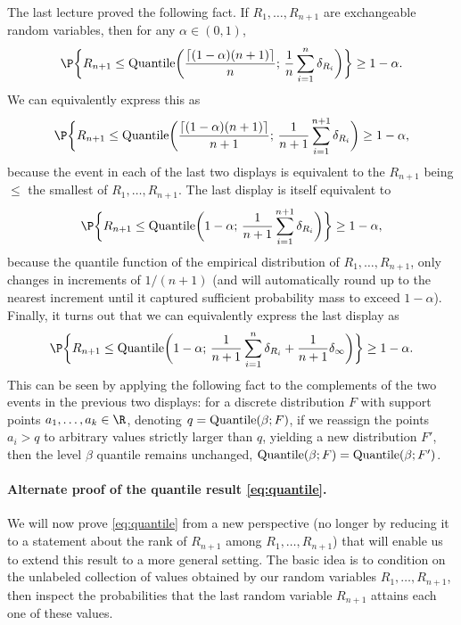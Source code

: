 \documentclass{article}
\begin{document}
The last lecture proved the following fact. If $R_1,\dots,R_{n+1}$ are
exchangeable random variables, then for any $\alpha \in (0,1)$, 
\[
\P\bigg\{ R_{n+1} \leq \Quantile\bigg( \frac{\lceil (1-\alpha)(n+1) \rceil}{n};
\, \frac{1}{n} \sum_{i=1}^n \delta_{R_i} \bigg) \bigg\} \geq 1-\alpha.
\]
We can equivalently express this as
\[
\P\bigg\{ R_{n+1} \leq \Quantile\bigg( \frac{\lceil (1-\alpha)(n+1) \rceil}{n+1}; 
\, \frac{1}{n+1} \sum_{i=1}^{n+1} \delta_{R_i} \bigg) \geq 1-\alpha,
\]
because the event in each of the last two displays is equivalent to the
$R_{n+1}$ being $\leq$ the  
smallest of $R_1,\dots,R_{n+1}$. The last display is itself equivalent to
\[
\P\bigg\{ R_{n+1} \leq \Quantile\bigg( 1-\alpha; \, \frac{1}{n+1}
\sum_{i=1}^{n+1} \delta_{R_i} \bigg) \bigg\} \geq 1-\alpha, 
\]
because the quantile function of the empirical distribution of
$R_1,\dots,R_{n+1}$, only changes in increments of $1/(n+1)$ (and will
automatically round up to the nearest increment until it captured sufficient
probability mass to exceed $1-\alpha$). Finally, it turns out that we can
equivalently express the last display as  
\begin{equation}
\label{eq:quantile}
\P\bigg\{ R_{n+1} \leq \Quantile\bigg( 1-\alpha; \, \frac{1}{n+1} \sum_{i=1}^n
\delta_{R_i} + \frac{1}{n+1} \delta_\infty \bigg) \bigg\} \geq 1-\alpha.
\end{equation}
This can be seen by applying the following fact to the complements of the two
events in the previous two displays: for a discrete distribution $F$ with
support points $a_1,\dots,a_k \in \R$, denoting $q=\mathrm{Quantile}(\beta; F)$, if we
reassign the points $a_i > q$ to arbitrary values strictly larger than $q$,
yielding a new distribution $F'$, then the level $\beta$ quantile remains
unchanged, $\mathrm{Quantile}(\beta; F) = \mathrm{Quantile}(\beta; F')$.  

\paragraph{Alternate proof of the quantile result \eqref{eq:quantile}.}

We will now prove \eqref{eq:quantile} from a new perspective (no longer by
reducing it to a statement about the rank of $R_{n+1}$ among
$R_1,\dots,R_{n+1}$) that will enable us to extend this result to a more general
setting. The basic idea is to condition on the unlabeled collection of values
obtained by our random variables $R_1,\dots,R_{n+1}$, then inspect the
probabilities that the last random variable $R_{n+1}$ attains each one of these
values.  
\end{document}
